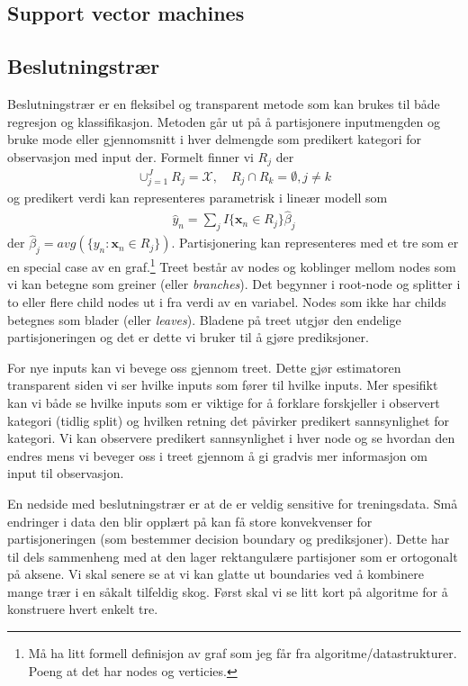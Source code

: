 \subsection{Support vector machines}
\subsection{Beslutningstrær}
Beslutningstrær er en fleksibel og transparent metode som kan brukes til både regresjon og klassifikasjon. Metoden går ut på å partisjonere inputmengden og bruke mode eller gjennomsnitt i hver delmengde som predikert kategori for observasjon med input der. Formelt finner vi $R_j$ der 
\begin{align}
\cup_{j=1}^JR_j = \mathcal{X}, \quad R_j \cap R_k = \emptyset, j \neq k 
\end{align}
og predikert verdi kan representeres parametrisk i lineær modell som
\begin{align}
\hat{y}_n=\sum_j I\{\mathbf{x}_n \in R_j\}\hat{\beta}_j
\end{align}
der $\hat{\beta}_j = avg(\{y_n: \mathbf{x}_n \in R_j\})$. Partisjonering kan representeres med et tre som er en special case av en graf.\footnote{Må ha litt formell definisjon av graf som jeg får fra algoritme/datastrukturer. Poeng at det har nodes og verticies.} Treet består av nodes og koblinger mellom nodes som vi kan betegne som greiner (eller \textit{branches}). Det begynner i root-node og splitter i to eller flere child nodes ut i fra verdi av en variabel. Nodes som ikke har childs betegnes som blader (eller \textit{leaves}). Bladene på treet utgjør den endelige partisjoneringen og det er dette vi bruker til å gjøre prediksjoner.

For nye inputs kan vi bevege oss gjennom treet. Dette gjør estimatoren transparent siden vi ser hvilke inputs som fører til hvilke inputs. Mer spesifikt kan vi både se hvilke inputs som er viktige for å forklare forskjeller i observert kategori (tidlig split) og hvilken retning det påvirker predikert sannsynlighet for kategori. Vi kan observere predikert sannsynlighet i hver node og se hvordan den endres mens vi beveger oss i treet gjennom å gi gradvis mer informasjon om input til observasjon.

En nedside med beslutningstrær er at de er veldig sensitive for treningsdata. Små endringer i data den blir opplært på kan få store konvekvenser for partisjoneringen (som bestemmer decision boundary og prediksjoner). Dette har til dels sammenheng med at den lager rektangulære partisjoner som er ortogonalt på aksene. Vi skal senere se at vi kan glatte ut boundaries ved å kombinere mange trær i en såkalt tilfeldig skog. Først skal vi se litt kort på algoritme for å konstruere hvert enkelt tre. 
